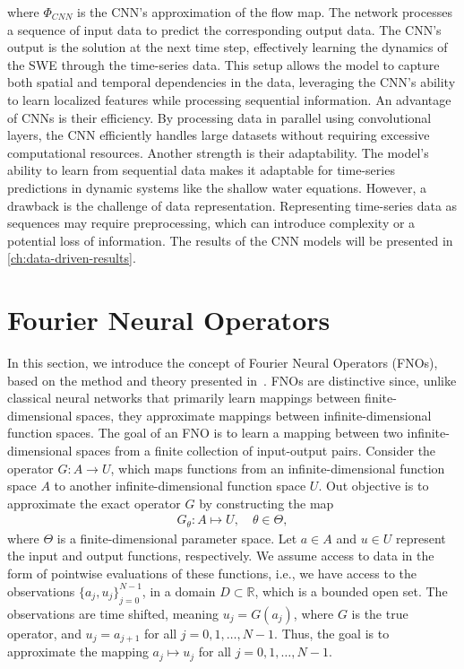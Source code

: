 where $\Phi_{CNN}$ is the CNN's approximation of the flow map.
The network processes a sequence of input data to predict the corresponding output data.
The CNN's output is the solution at the next time step, effectively learning the dynamics of the SWE through the time-series data.
This setup allows the model to capture both spatial and temporal dependencies in the data, leveraging the CNN's ability to learn localized features while processing sequential information.
An advantage of CNNs is their efficiency.
By processing data in parallel using convolutional layers, the CNN efficiently handles large datasets without requiring excessive computational resources.
Another strength is their adaptability. The model's ability to learn from sequential data makes it adaptable for time-series predictions in dynamic systems like the shallow water equations.
However, a drawback is the challenge of data representation.
Representing time-series data as sequences may require preprocessing, which can introduce complexity or a potential loss of information.
The results of the CNN models will be presented in \autoref{ch:data-driven-results}.

\section{Fourier Neural Operators}
In this section, we introduce the concept of Fourier Neural Operators (FNOs), based on the method and theory presented in~\cite{FNO_2021}.
FNOs are distinctive since, unlike classical neural networks that primarily learn mappings between finite-dimensional spaces, they approximate mappings between infinite-dimensional function spaces.
The goal of an FNO is to learn a mapping between two infinite-dimensional spaces from a finite collection of input-output pairs.
Consider the operator $G: A \to U$, which maps functions from an infinite-dimensional function space $A$ to another infinite-dimensional function space $U$.
Out objective is to approximate the exact operator $G$ by constructing the map
\begin{align}\label{eq:FNO_map}
    G_{\theta}: A \mapsto U, \quad \theta \in \Theta,
\end{align} 
where $\Theta$ is a finite-dimensional parameter space.
Let $a \in A$ and $u \in U$ represent the input and output functions, respectively.
We assume access to data in the form of pointwise evaluations of these functions, i.e., we have access to the observations ${\{a_j, u_j \}}_{j=0}^{N-1}$, in a domain $D \subset \mathbb{R}$, which is a bounded open set.
The observations are time shifted, meaning $u_j = G(a_j)$, where $G$ is the true operator, and $u_j = a_{j+1}$ for all $j = 0, 1, \ldots, N-1$.
Thus, the goal is to approximate the mapping $a_j \mapsto u_j$ for all $j = 0, 1, \ldots, N-1$.

